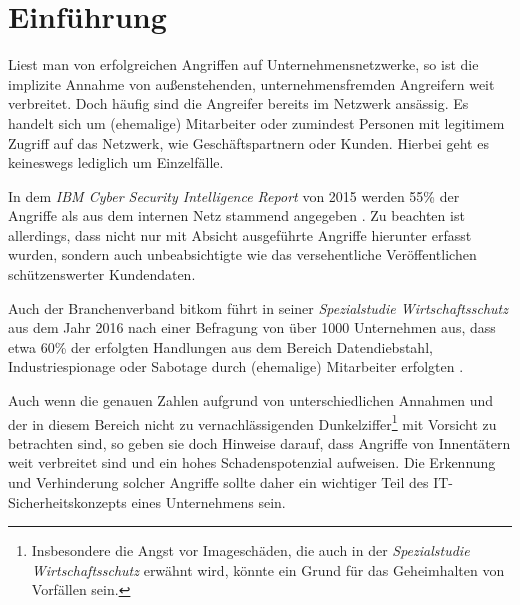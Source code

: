 \chapter{Einführung}

\label{cha_introduction}










Liest man von erfolgreichen Angriffen auf Unternehmensnetzwerke, so ist die implizite Annahme von außenstehenden, unternehmensfremden Angreifern weit verbreitet. Doch häufig sind die Angreifer bereits im Netzwerk ansässig. Es handelt sich um (ehemalige) Mitarbeiter oder zumindest Personen mit legitimem Zugriff auf das Netzwerk, wie Geschäftspartnern oder Kunden. Hierbei geht es keineswegs lediglich um Einzelfälle. 

In dem \textit{IBM Cyber Security Intelligence Report} von 2015 werden 55\% der Angriffe als aus dem internen Netz stammend angegeben \cite{ibm2015}. Zu beachten ist allerdings, dass nicht nur mit Absicht ausgeführte Angriffe hierunter erfasst wurden, sondern auch unbeabsichtigte wie das versehentliche Veröffentlichen schützenswerter Kundendaten.

Auch der Branchenverband bitkom führt in seiner \textit{Spezialstudie Wirtschaftsschutz} aus dem Jahr 2016 nach einer Befragung von über 1000 Unternehmen aus, dass etwa 60\% der erfolgten Handlungen aus dem Bereich Datendiebstahl, Industriespionage oder Sabotage durch (ehemalige) Mitarbeiter erfolgten \cite{bitkom2016}.


Auch wenn die genauen Zahlen aufgrund von unterschiedlichen Annahmen und der in diesem Bereich nicht zu vernachlässigenden Dunkelziffer\footnote{
	Insbesondere die Angst vor Imageschäden, die auch in der \textit{Spezialstudie Wirtschaftsschutz} erwähnt wird, könnte ein Grund für das Geheimhalten von Vorfällen sein.
} mit Vorsicht zu betrachten sind, so geben sie doch Hinweise darauf, dass Angriffe von Innentätern weit verbreitet sind und ein hohes Schadenspotenzial aufweisen. Die Erkennung und Verhinderung solcher Angriffe sollte daher ein wichtiger Teil des IT-Sicherheitskonzepts eines Unternehmens sein.

